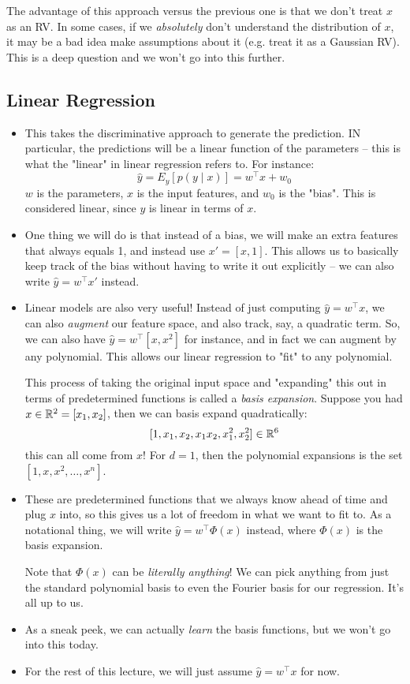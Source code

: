 \begin{itemize}
\begin{enumerate}[label=\arabic*.]
				The advantage of this approach versus the previous one is that we
				don't treat \( x \) as an RV. In some cases, if we
				\textit{absolutely} don't understand the distribution of \( x \), it
				may be a bad idea make assumptions about it (e.g. treat it as a
				Gaussian RV). This is a deep question and we won't go into this
				further.   
		\end{enumerate}
\end{itemize}
\subsection{Linear Regression}
\begin{itemize}
	\item This takes the discriminative approach to generate the prediction. IN
		particular, the predictions will be a linear function of the parameters --
		this is what the "linear" in linear regression refers to. For instance:
		\[
			\hat{y} = E_y[p(y \mid x)] = w^{\top} x + w_0
		\]
		\( w \) is the parameters, \( x \) is the input features, and \( w_0 \) is
		the "bias". This is considered linear, since \( y \) is linear in terms 
		of \( x \). 
	\item One thing we will do is that instead of a bias, we will make an extra
		features that always equals 1, and instead use \( x' = [x, 1] \). This allows
		us to basically keep track of the bias without having to write it out
		explicitly -- we can also write \( \hat{y} = w^{\top} x' \) instead.  
	\item Linear models are also very useful! Instead of just computing \( \hat{y} =
		w^{\top} x\), we can also \textit{augment} our feature space, and also track,
		say, a quadratic term. So, we can also have \( \hat{y} = w^{\top}[x, x^2] \)
		for instance, and in fact we can augment by any polynomial. This allows our
		linear regression to "fit" to any polynomial. 

		This process of taking the original input space and "expanding" this out in
		terms of predetermined functions is called a \textit{basis expansion}.
		Suppose you had \( x \in \mathbb R^{2} = [x_1, x_2] \), then we can basis expand
		quadratically:
		\[
			[1, x_1, x_2, x_1x_2, x_1^2, x_2^2] \in \mathbb R^{6}
		\]
		this can all come from \( x \)! For \( d = 1 \), then the polynomial
		expansions is the set \( [1, x, x^2, \dots, x^{n}] \).  
	\item These are predetermined functions that we always know ahead of time and
		plug \( x \) into, so this gives us a lot of freedom in what we want to fit
		to. As a notational thing, we will write \( \hat{y} = w^{\top} \Phi(x) \)
		instead, where \( \Phi(x) \) is the basis expansion.    

		Note that \( \Phi(x) \) can be \textit{literally anything}! We can pick
		anything from just the standard polynomial basis to even the Fourier basis
		for our regression. It's all up to us. 
	\item As a sneak peek, we can actually \textit{learn} the basis functions, but we
		won't go into this today. 
	\item For the rest of this lecture, we will just assume \( \hat{y} =
		w^{\top} x \) for now. 
\end{itemize}
